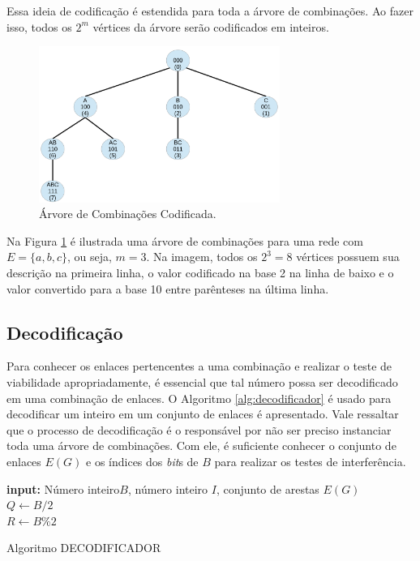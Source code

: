 Essa ideia de codificação é estendida para toda a árvore de combinações. Ao fazer isso, todos os $2^m$ vértices da árvore serão codificados em inteiros.

\begin{figure}[htb]
\centering
\includegraphics[width=0.7\textwidth]{figs/codificacao}
\caption[Árvore de Combinações Codificada.]
{Árvore de Combinações Codificada.}
\label{fig:codificacao}
\end{figure}

Na Figura \ref{fig:codificacao} é ilustrada uma árvore de combinações para uma rede com $E=\{a,b,c\}$, ou seja, $m=3$. Na imagem, todos os $2^3 = 8$ vértices possuem sua descrição na primeira linha, o valor codificado na base 2 na linha de baixo e o valor convertido para a base 10 entre parênteses na última linha.

\subsection{Decodificação}

Para conhecer os enlaces pertencentes a uma combinação e realizar o teste de viabilidade apropriadamente, é essencial que tal número possa ser decodificado em uma combinação de enlaces. O Algoritmo \ref{alg:decodificador} é usado para decodificar um inteiro em um conjunto de enlaces é apresentado. Vale ressaltar que o processo de decodificação é o responsável por não ser preciso instanciar toda uma árvore de combinações. Com ele, é suficiente conhecer o conjunto de enlaces $E(G)$ e os índices dos {\it bit}s de $B$ para realizar os testes de interferência.

\begin{algorithm}[h]
	\SetVline
	{\bf input:} Número inteiro$B$, número inteiro $I$, conjunto de arestas $E(G)$\\
	$Q \leftarrow B/2$\\
	$R \leftarrow B\%2$\\
\caption{Algoritmo DECODIFICADOR}
\label{alg:decodificador}
\end{algorithm}


